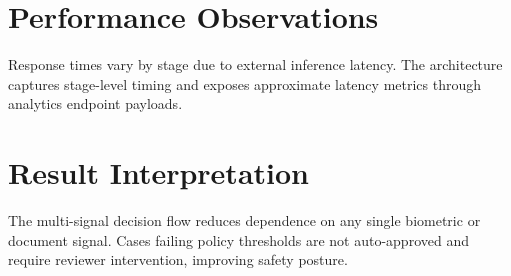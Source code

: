 \section{Performance Observations}
Response times vary by stage due to external inference latency. The architecture captures stage-level timing and exposes approximate latency metrics through analytics endpoint payloads.

\section{Result Interpretation}
The multi-signal decision flow reduces dependence on any single biometric or document signal. Cases failing policy thresholds are not auto-approved and require reviewer intervention, improving safety posture.
